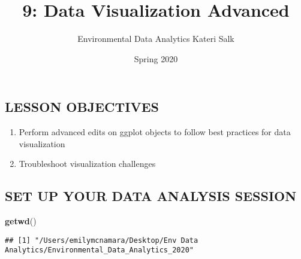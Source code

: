 \documentclass[]{article}
\title{9: Data Visualization Advanced}
\author{Environmental Data Analytics \textbar{} Kateri Salk}
\date{Spring 2020}
\newenvironment{Shaded}{\begin{snugshade}}{\end{snugshade}}
\newcommand{\KeywordTok}[1]{\textcolor[rgb]{0.13,0.29,0.53}{\textbf{#1}}}
\newcommand{\NormalTok}[1]{#1}
\providecommand{\tightlist}{%
  \setlength{\itemsep}{0pt}\setlength{\parskip}{0pt}}
\begin{document}
\maketitle

\subsection{LESSON OBJECTIVES}\label{lesson-objectives}

\begin{enumerate}
\def\labelenumi{\arabic{enumi}.}
\tightlist
\item
  Perform advanced edits on ggplot objects to follow best practices for
  data visualization
\item
  Troubleshoot visualization challenges
\end{enumerate}

\subsection{SET UP YOUR DATA ANALYSIS
SESSION}\label{set-up-your-data-analysis-session}

\begin{Shaded}
\begin{Highlighting}[]
\KeywordTok{getwd}\NormalTok{()}
\end{Highlighting}
\end{Shaded}

\begin{verbatim}
## [1] "/Users/emilymcnamara/Desktop/Env Data Analytics/Environmental_Data_Analytics_2020"
\end{verbatim}
\end{document}
